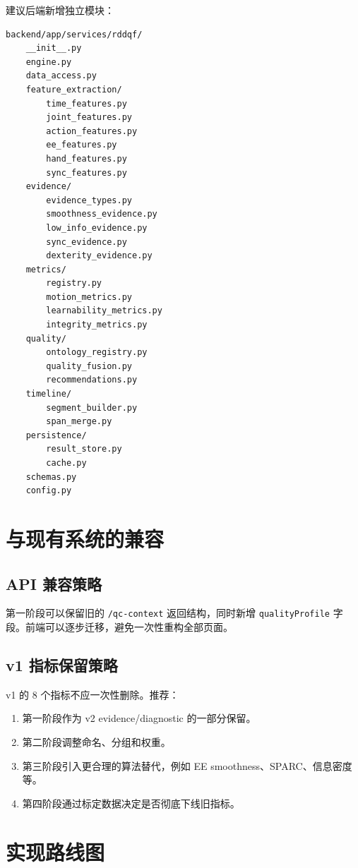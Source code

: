 \documentclass[UTF8,zihao=-4]{ctexart}
\newcommand{\Code}[1]{\texttt{#1}}
\begin{document}
建议后端新增独立模块：

\begin{verbatim}
backend/app/services/rddqf/
    __init__.py
    engine.py
    data_access.py
    feature_extraction/
        time_features.py
        joint_features.py
        action_features.py
        ee_features.py
        hand_features.py
        sync_features.py
    evidence/
        evidence_types.py
        smoothness_evidence.py
        low_info_evidence.py
        sync_evidence.py
        dexterity_evidence.py
    metrics/
        registry.py
        motion_metrics.py
        learnability_metrics.py
        integrity_metrics.py
    quality/
        ontology_registry.py
        quality_fusion.py
        recommendations.py
    timeline/
        segment_builder.py
        span_merge.py
    persistence/
        result_store.py
        cache.py
    schemas.py
    config.py
\end{verbatim}

\section{与现有系统的兼容}

\subsection{API 兼容策略}

第一阶段可以保留旧的 \Code{/qc-context} 返回结构，同时新增 \Code{qualityProfile} 字段。前端可以逐步迁移，避免一次性重构全部页面。

\subsection{v1 指标保留策略}

v1 的 8 个指标不应一次性删除。推荐：

\begin{enumerate}
\item 第一阶段作为 v2 evidence/diagnostic 的一部分保留。
\item 第二阶段调整命名、分组和权重。
\item 第三阶段引入更合理的算法替代，例如 EE smoothness、SPARC、信息密度等。
\item 第四阶段通过标定数据决定是否彻底下线旧指标。
\end{enumerate}

\section{实现路线图}
\end{document}
